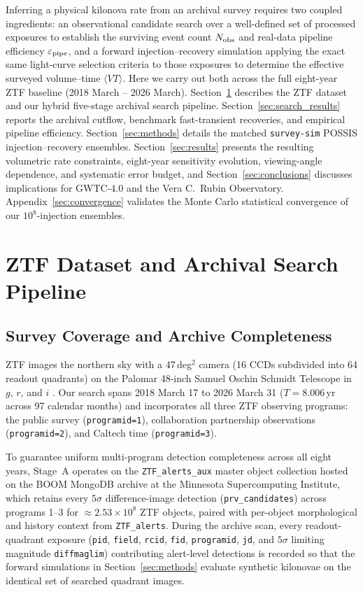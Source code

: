 \documentclass[twocolumn]{aastex631}
\newcommand{\vteff}{\langle VT\rangle}
\newcommand{\epspipe}{\varepsilon_{\rm pipe}}
\begin{document}
Inferring a physical kilonova rate from an archival survey requires two coupled ingredients: an observational candidate search over a well-defined set of processed exposures to establish the surviving event count $N_{\rm obs}$ and real-data pipeline efficiency $\epspipe$, and a forward injection--recovery simulation applying the exact same light-curve selection criteria to those exposures to determine the effective surveyed volume--time $\vteff$. Here we carry out both across the full eight-year ZTF baseline (2018 March -- 2026 March). Section~\ref{sec:search_pipeline} describes the ZTF dataset and our hybrid five-stage archival search pipeline. Section~\ref{sec:search_results} reports the archival cutflow, benchmark fast-transient recoveries, and empirical pipeline efficiency. Section~\ref{sec:methods} details the matched \texttt{survey-sim} POSSIS injection--recovery ensembles. Section~\ref{sec:results} presents the resulting volumetric rate constraints, eight-year sensitivity evolution, viewing-angle dependence, and systematic error budget, and Section~\ref{sec:conclusions} discusses implications for GWTC-4.0 and the Vera C.\ Rubin Observatory. Appendix~\ref{sec:convergence} validates the Monte Carlo statistical convergence of our $10^8$-injection ensembles.

\section{ZTF Dataset and Archival Search Pipeline}
\label{sec:search_pipeline}

\subsection{Survey Coverage and Archive Completeness}
ZTF images the northern sky with a 47\,deg$^2$ camera (16 CCDs subdivided into 64 readout quadrants) on the Palomar 48-inch Samuel Oschin Schmidt Telescope in $g$, $r$, and $i$ \citep{Bellm2019, Dekany2020}. Our search spans 2018 March 17 to 2026 March 31 ($T = 8.006$\,yr across 97 calendar months) and incorporates all three ZTF observing programs: the public survey (\texttt{programid=1}), collaboration partnership observations (\texttt{programid=2}), and Caltech time (\texttt{programid=3}).

To guarantee uniform multi-program detection completeness across all eight years, Stage~A operates on the \texttt{ZTF\_alerts\_aux} master object collection hosted on the BOOM MongoDB archive at the Minnesota Supercomputing Institute, which retains every $5\sigma$ difference-image detection (\texttt{prv\_candidates}) across programs 1--3 for $\approx 2.53\times 10^8$ ZTF objects, paired with per-object morphological and history context from \texttt{ZTF\_alerts}. During the archive scan, every readout-quadrant exposure (\texttt{pid}, \texttt{field}, \texttt{rcid}, \texttt{fid}, \texttt{programid}, \texttt{jd}, and $5\sigma$ limiting magnitude \texttt{diffmaglim}) contributing alert-level detections is recorded so that the forward simulations in Section~\ref{sec:methods} evaluate synthetic kilonovae on the identical set of searched quadrant images.
\end{document}
